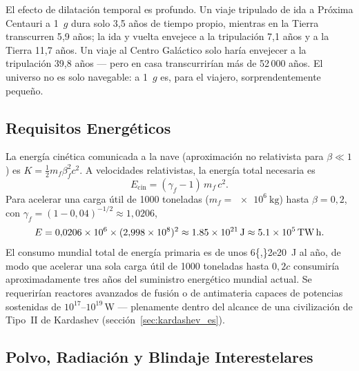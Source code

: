 \documentclass[12pt,a4paper]{article}
\begin{document}
El efecto de dilatación temporal es profundo. Un viaje tripulado de ida a
Próxima Centauri a 1~$g$ dura solo 3{,}5 años de tiempo propio, mientras en la
Tierra transcurren 5{,}9 años; la ida y vuelta envejece a la tripulación 7{,}1
años y a la Tierra 11{,}7 años. Un viaje al Centro Galáctico solo haría
envejecer a la tripulación 39{,}8 años --- pero en casa transcurrirían más de
52\,000 años. El universo no es solo navegable: a 1~$g$ es, para el viajero,
sorprendentemente pequeño.

\subsection{Requisitos Energéticos}

La energía cinética comunicada a la nave (aproximación no relativista para
$\beta \ll 1$) es $K = \tfrac{1}{2} m_f \beta_f^2 c^2$. A velocidades
relativistas, la energía total necesaria es
\begin{equation}
  E_{\mathrm{cin}} = (\gamma_f - 1)\,m_f\,c^2.
  \label{eq:kinetic_rel_es}
\end{equation}
Para acelerar una carga útil de 1000 toneladas ($m_f = \SI{e6}{\kilo\gram}$)
hasta $\beta = 0{,}2$, con $\gamma_f = (1-0{,}04)^{-1/2} \approx 1{,}0206$,
\begin{equation*}
  E = 0{,}0206 \times 10^6 \times (2{,}998\times10^{8})^2
    \approx \SI{1{,}85e21}{\joule} \approx \SI{5{,}1e5}{\tera\watt\hour}.
\end{equation*}
El consumo mundial total de energía primaria es de unos
\SI{6{,}2e20}{\joule} al año, de modo que acelerar una sola carga útil de 1000
toneladas hasta $0{,}2c$ consumiría aproximadamente tres años del suministro
energético mundial actual. Se requerirían reactores avanzados de fusión o de
antimateria capaces de potencias sostenidas de $10^{17}$--$10^{19}$\,W ---
plenamente dentro del alcance de una civilización de Tipo~II de Kardashev
(sección~\ref{sec:kardashev_es}).

\subsection{Polvo, Radiación y Blindaje Interestelares}
\end{document}
